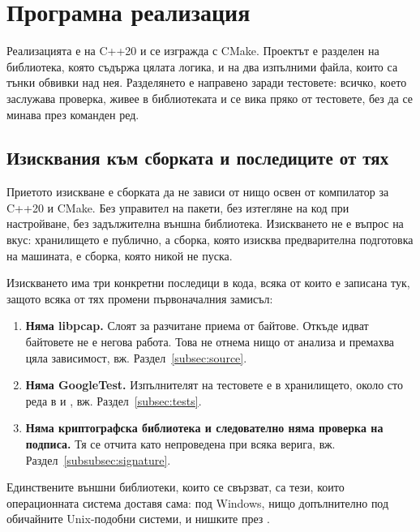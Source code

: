 \section{Програмна реализация}
\label{sec:implementation}

Реализацията е на C++20 и се изгражда с CMake. Проектът е разделен на библиотека, която
съдържа цялата логика, и на два изпълними файла, които са тънки обвивки над нея.
Разделянето е направено заради тестовете: всичко, което заслужава проверка, живее в
библиотеката и се вика пряко от тестовете, без да се минава през команден ред.

\subsection{Изисквания към сборката и последиците от тях}
\label{subsec:build}

Приетото изискване е сборката да не зависи от нищо освен от компилатор за C++20 и CMake.
Без управител на пакети, без изтегляне на код при настройване, без задължителна външна
библиотека. Изискването не е въпрос на вкус: хранилището е публично, а сборка, която
изисква предварителна подготовка на машината, е сборка, която никой не пуска.

Изискването има три конкретни последици в кода, всяка от които е записана тук, защото всяка
от тях промени първоначалния замисъл:

\begin{enumerate}[topsep=2pt,itemsep=2pt,leftmargin=*]
\item \textbf{Няма libpcap.} Слоят за разчитане приема  от байтове. Откъде
      идват байтовете не е негова работа. Това не отнема нищо от анализа и премахва цяла
      зависимост, вж. Раздел~\ref{subsec:source}.
\item \textbf{Няма GoogleTest.} Изпълнителят на тестовете е в хранилището, около сто реда в
       и , вж. Раздел~\ref{subsec:tests}.
\item \textbf{Няма криптографска библиотека и следователно няма проверка на подписа.} Тя се
      отчита като непроведена при всяка верига, вж. Раздел~\ref{subsubsec:signature}.
\end{enumerate}

Единствените външни библиотеки, които се свързват, са тези, които операционната система
доставя сама:  под Windows, нищо допълнително под обичайните Unix-подобни
системи, и нишките през .

